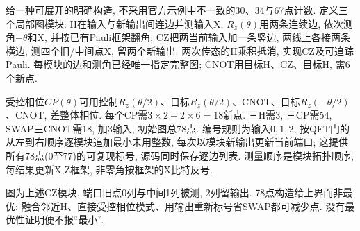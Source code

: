 \begin{solution}给一种可展开的明确构造, 不采用官方示例中不一致的30、34与67点计数. 定义三个局部图模块: H在输入与新输出间连边并测输入X; $R_z(\theta)$用两条连续边, 依次测角$-\theta$和X, 并按已有Pauli框架翻角; CZ把两当前输入加一条竖边, 两线上各接两条横边, 测四个旧/中间点X, 留两个新输出. 两次传态的H乘积抵消, 实现CZ及可追踪Pauli. 每模块的边和测角已经唯一指定完整图; CNOT用目标H、CZ、目标H, 需6个新点.

受控相位$CP(\theta)$可用控制$R_z(\theta/2)$、目标$R_z(\theta/2)$、CNOT、目标$R_z(-\theta/2)$、CNOT, 差整体相位. 每个CP需$3\times2+2\times6=18$新点. 三H需3, 三CP需54, SWAP三CNOT需18, 加3输入, 初始图总78点. 编号规则为输入$0,1,2$, 按QFT门的从左到右顺序逐模块追加最小未用整数, 每次以模块新输出更新当前端口; 这提供所有78点(0至77)的可复现标号, 源码同时保存逐边列表. 测量顺序是模块拓扑顺序, 每结果更新X,Z框架, 非零角按框架的X比特反号.

\begin{center}\end{center}
图为上述CZ模块, 端口旧点0列与中间1列被测, 2列留输出. 78点构造给上界而非最优; 融合邻近H、直接受控相位模式、用输出重新标号省SWAP都可减少点. 没有最优性证明便不报“最小”.
\end{solution}

